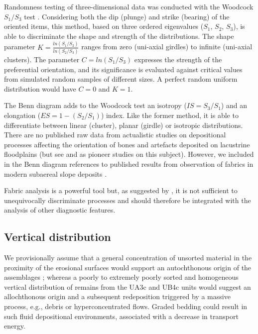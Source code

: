 \documentclass[review,authoryear,times]{elsarticle} %
\begin{document}
Randomness testing of three-dimensional data was conducted with the Woodcock $S_1/S_3$ test \citep{Woodcock1983}. Considering both the dip (plunge) and strike (bearing) of the oriented items, this method, based on three ordered eigenvalues ($S_1$, $S_2$, $S_3$), is able to discriminate the shape and strength of the distributions. The shape parameter $K=\frac{ln(S_1/S_2)}{ln(S_2/S_3)}$ ranges from zero (uni-axial girdles) to infinite (uni-axial clusters). The parameter $C=ln(S_1/S_3)$ expresses the strength of the preferential orientation, and its significance is evaluated against critical values from simulated random samples of different sizes. A perfect random uniform distribution would have $C=0$ and $K=1$. %

The Benn \citep{Benn1994} diagram adds to the Woodcock test an isotropy ($IS=S_3/S_1$) and an elongation ($ES=1-(S_2/S_1)$) index. Like the former method, it is able to differentiate between linear (cluster), planar (girdle) or isotropic distributions. There are no published raw data from actualistic studies on depositional processes affecting the orientation of bones and artefacts deposited on lacustrine floodplains (but see \cite{Morton2004} and \cite{Cobo-Sanchez2014} as pioneer studies on this subject). However, we included in the Benn diagram references to published results from observation of fabrics in modern subaereal slope deposits \citep{Bertran1997,Lenoble2004}.

Fabric analysis is a powerful tool but, as suggested by \cite{Lenoble2004}, it is not sufficient to unequivocally discriminate processes and should therefore be integrated with the analysis of other diagnostic features.

\subsection{Vertical distribution}

We provisionally assume that a general concentration of unsorted material in the proximity of the erosional surfaces would support an autochthonous origin of the assemblages %
; whereas a poorly to extremely poorly sorted and homogeneous vertical distribution of remains from the UA3c and UB4c units would suggest an allochthonous origin %
and a subsequent redeposition %
triggered by a massive process, e.g., debris or hyperconcentrated flows. Graded bedding could result in such fluid depositional environments, associated with a decrease in transport energy.
\end{document}
